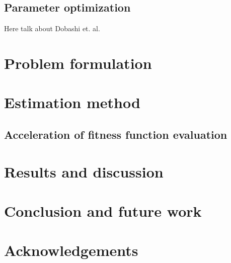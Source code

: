 \documentclass{acmsiggraph}
\begin{document}
\subsection{Parameter optimization}

Here talk about Dobashi et. al.


\section{Problem formulation}

\section{Estimation method}

\subsection{Acceleration of fitness function evaluation}

\section{Results and discussion}

\section{Conclusion and future work}

\section*{Acknowledgements}


\nocite{*}

\end{document}
